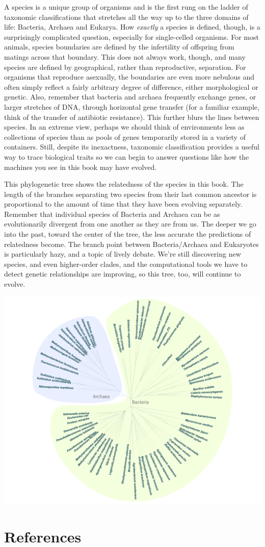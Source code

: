 \documentclass[]{tufte-book}
\begin{document}
A species is a unique group of organisms and is the first rung on the
ladder of taxonomic classifications that stretches all the way up to the
three domains of life: Bacteria, Archaea and Eukarya. How \emph{exactly}
a species is defined, though, is a surprisingly complicated question,
especially for single-celled organisms. For most animals, species
boundaries are defined by the infertility of offspring from matings
across that boundary. This does not always work, though, and many
species are defined by geographical, rather than reproductive,
separation. For organisms that reproduce asexually, the boundaries are
even more nebulous and often simply reflect a fairly arbitrary degree of
difference, either morphological or genetic. Also, remember that
bacteria and archaea frequently exchange genes, or larger stretches of
DNA, through horizontal gene transfer (for a familiar example, think of
the transfer of antibiotic resistance). This further blurs the lines
between species. In an extreme view, perhaps we should think of
environments less as collections of species than as pools of genes
temporarily stored in a variety of containers. Still, despite its
inexactness, taxonomic classification provides a useful way to trace
biological traits so we can begin to answer questions like how the
machines you see in this book may have evolved.

This phylogenetic tree shows the relatedness of the species in this
book. The length of the branches separating two species from their last
common ancestor is proportional to the amount of time that they have
been evolving separately. Remember that individual species of Bacteria
and Archaea can be as evolutionarily divergent from one another as they
are from us. The deeper we go into the past, toward the center of the
tree, the less accurate the predictions of relatedness become. The
branch point between Bacteria/Archaea and Eukaryotes is particularly
hazy, and a topic of lively debate. We're still discovering new species,
and even higher-order clades, and the computational tools we have to
detect genetic relationships are improving, so this tree, too, will
continue to evolve.

\includegraphics{img/Tree}

\chapter{References}\label{references}


\end{document}
